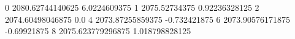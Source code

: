 0 2080.62744140625 6.0224609375
1 2075.52734375 0.92236328125
2 2074.60498046875 0.0
4 2073.87255859375 -0.732421875
6 2073.90576171875 -0.69921875
8 2075.623779296875 1.018798828125
